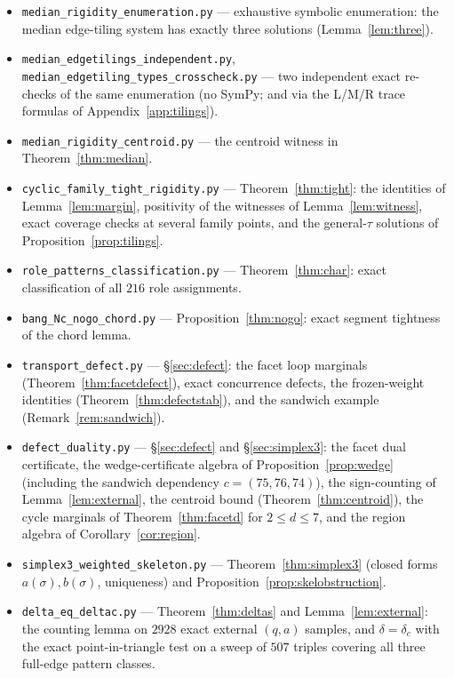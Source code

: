 \documentclass[11pt,reqno]{amsart}
\theoremstyle{plain}
\theoremstyle{definition}
\theoremstyle{remark}
\begin{document}
\begin{itemize}
\item\texttt{median\_rigidity\_enumeration.py} --- exhaustive symbolic
enumeration: the median edge-tiling system has exactly three solutions
(Lemma~\ref{lem:three}).
\item\texttt{median\_edgetilings\_independent.py},
\texttt{median\_edgetiling\_types\_crosscheck.py} --- two independent exact
re-checks of the same enumeration (no SymPy; and via the L/M/R trace
formulas of Appendix~\ref{app:tilings}).
\item\texttt{median\_rigidity\_centroid.py} --- the centroid witness in
Theorem~\ref{thm:median}.
\item\texttt{cyclic\_family\_tight\_rigidity.py} --- Theorem~\ref{thm:tight}:
the identities of Lemma~\ref{lem:margin}, positivity of the witnesses of
Lemma~\ref{lem:witness}, exact coverage checks at several family points, and
the general-$\tau$ solutions of Proposition~\ref{prop:tilings}.
\item\texttt{role\_patterns\_classification.py} --- Theorem~\ref{thm:char}:
exact classification of all $216$ role assignments.
\item\texttt{bang\_Nc\_nogo\_chord.py} --- Proposition~\ref{thm:nogo}: exact
segment tightness of the chord lemma.
\item\texttt{transport\_defect.py} --- \S\ref{sec:defect}: the facet loop
marginals (Theorem~\ref{thm:facetdefect}), exact concurrence defects, the
frozen-weight identities (Theorem~\ref{thm:defectstab}), and the sandwich
example (Remark~\ref{rem:sandwich}).
\item\texttt{defect\_duality.py} --- \S\ref{sec:defect} and
\S\ref{sec:simplex3}: the facet dual certificate, the wedge-certificate
algebra of Proposition~\ref{prop:wedge} (including the sandwich dependency
$c=(75,76,74)$), the sign-counting of Lemma~\ref{lem:external}, the centroid
bound (Theorem~\ref{thm:centroid}), the cycle marginals of
Theorem~\ref{thm:facetd} for $2\le d\le7$, and the region algebra of
Corollary~\ref{cor:region}.
\item\texttt{simplex3\_weighted\_skeleton.py} --- Theorem~\ref{thm:simplex3}
(closed forms $a(\sigma),b(\sigma)$, uniqueness) and
Proposition~\ref{prop:skelobstruction}.
\item\texttt{delta\_eq\_deltac.py} --- Theorem~\ref{thm:deltas} and
Lemma~\ref{lem:external}: the counting lemma on $2928$ exact external
$(q,a)$ samples, and $\delta=\delta_c$ with the exact point-in-triangle test
on a sweep of $507$ triples covering all three full-edge pattern classes.

\end{itemize}
\end{document}
